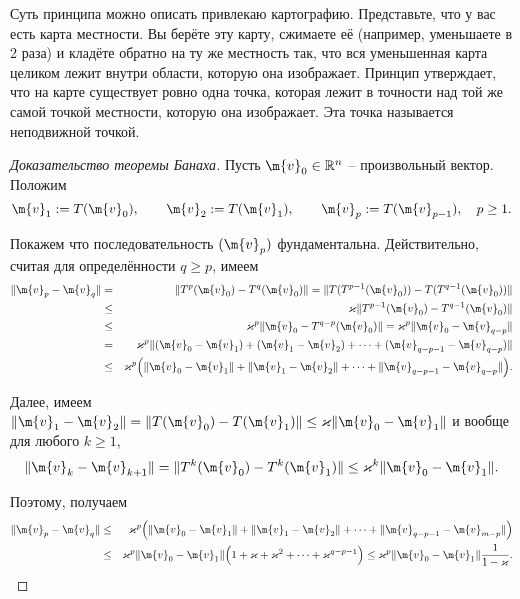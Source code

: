 \begin{remark}
    Суть принципа можно описать привлекаю картографию. Представьте, что у вас есть карта местности. Вы берёте эту карту, сжимаете её (например, уменьшаете в 2 раза) и кладёте обратно на ту же местность так, что вся уменьшенная карта целиком лежит внутри области, которую она изображает. Принцип утверждает, что на карте существует ровно одна точка, которая лежит в точности над той же самой точкой местности, которую она изображает. Эта точка называется неподвижной точкой.
\end{remark}

\begin{proof}[Доказательство теоремы Банаха]
Пусть $\m{v}_0 \in \mathbb{R}^n$ -- произвольный вектор. Положим
\[
 \m{v}_1: = T(\m{v}_0), \qquad \m{v}_2: = T(\m{v}_1), \qquad \m{v}_p: = T(\m{v}_{p-1}), \quad p \ge 1.
\]

Покажем что последовательность $(\m{v}_p)$ фундаментальна. Действительно, считая для определённости $q \ge p$, имеем
\begin{eqnarray*}
    \| \m{v}_p - \m{v}_q  \| &=& \| T^p(\m{v}_0) - T^q (\m{v}_0)  \| =\| T(T^{p-1}(\m{v}_0)) - T(T^{q-1}(\m{v}_0)) \| \\
    &\le & \varkappa \| T^{p-1} (\m{v}_0) - T^{q-1} (\m{v}_0) \| \\
    &\le & \varkappa^p \|  \m{v}_0 - T^{q-p}(\m{v}_0)  \| = \varkappa^p \| \m{v}_0 - \m{v}_{q-p} \| \\
    &=& \varkappa^p \| (\m{v}_0 - \m{v}_1) + (\m{v}_1 - \m{v}_2) + \cdots +(\m{v}_{q-p-1} - \m{v}_{q-p})   \| \\
    &\le & \varkappa^p \Bigl( \| \m{v}_0  - \m{v}_1 \| + \| \m{v}_1 - \m{v}_2\| + \cdots + \| \m{v}_{q-p-1} - \m{v}_{q-p} \| \Bigr).
\end{eqnarray*}

Далее, имеем $\| \m{v}_1 - \m{v}_2 \| = \| T(\m{v}_0) - T(\m{v}_1)  \| \le \varkappa \| \m{v}_0- \m{v}_1\|$ и вообще для любого $k \ge 1$,
\[
 \| \m{v}_{k} - \m{v}_{k+1} \| = \| T^k(\m{v}_0) - T^k(\m{v}_1) \| \le \varkappa^k \| \m{v}_0 - \m{v}_1\|.
\]

Поэтому, получаем
\begin{eqnarray*}
    \| \m{v}_p - \m{v}_q  \|
    &\le & \varkappa^p \Bigl( \| \m{v}_0  - \m{v}_1 \| + \| \m{v}_1 - \m{v}_2\| + \cdots + \| \m{v}_{q-p-1} - \m{v}_{m-p} \| \Bigr)\\
    &\le & \varkappa^p \| \m{v}_0 - \m{v}_1 \| \Bigl( 1+ \varkappa + \varkappa^2 + \cdots + \varkappa^{q-p-1} \Bigr) \le \varkappa^p \| \m{v}_0 - \m{v}_1 \| \frac{1}{1- \varkappa}.
\end{eqnarray*}


\end{proof}
